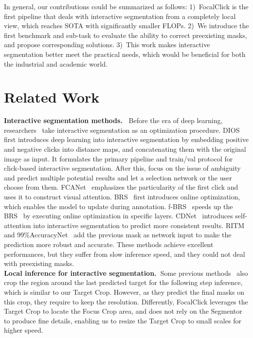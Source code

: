 \documentclass[10pt,twocolumn,letterpaper]{article}
\begin{document}
In general, our contributions could be summarized as follows: 1)~FocalClick is the first pipeline that deals with interactive segmentation from a completely local view, which reaches SOTA with significantly smaller FLOPs.  2)~We introduce the first benchmark and sub-task to evaluate the ability to correct preexisting masks, and propose corresponding solutions.  3)~This work makes interactive segmentation better meet the practical needs, which would be beneficial for both the industrial and academic world.
    
    
 

    

    


\section{Related Work}


\noindent \textbf{Interactive segmentation methods.~} Before the era of deep learning, researchers~\cite{rother2004grabcut,gulshan2010geodesic,grady2006random,kim2010nonparametric} take interactive segmentation as an optimization procedure.
DIOS~\cite{xu2016deep} first introduces deep learning into interactive segmentation by embedding positive and negative clicks into distance maps, and concatenating them with the original image as input. It formulates the primary pipeline and train/val protocol for click-based interactive segmentation. After this, \cite{li2018latentdiversity, liew2019multiseg} focus on the issue of ambiguity and predict multiple potential results and let a selection network or the user choose from them. FCANet~\cite{firstclick} emphasizes the particularity of the first click and uses it to construct visual attention. BRS~\cite{jang2019brs} first introduces online optimization, which enables the model to update during annotation. f-BRS~\cite{fbrs} speeds up the BRS~\cite{jang2019brs} by executing online optimization in specific layers.
CDNet~\cite{chen2021cdnet} introduces self-attention into interactive segmentation to predict more consistent results. RITM~\cite{sofiiuk2021ritm} and 99\%AccuracyNet~\cite{forte2020getting99} add the previous mask as network input to make the prediction more robust and accurate. 
These methods achieve excellent performances, but they suffer from slow inference speed, and they could not deal with preexisting masks.\\


\noindent \textbf{ Local inference for interactive segmentation.~}Some previous methods~\cite{fbrs,chen2021cdnet,sofiiuk2021ritm} also crop the region around the last predicted target for the following step inference, which is similar to our Target Crop. However, as they predict the final masks on this crop, they require to keep the resolution. Differently, FocalClick leverages the Target Crop to locate the Focus Crop area, and does not rely on the Segmentor to produce fine details, enabling us to resize the Target Crop to small scales for higher speed. 
\end{document}
